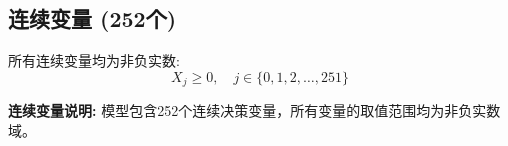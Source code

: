 \documentclass[a4paper,10pt]{article}
\begin{document}
\subsection{连续变量 (252个)}

所有连续变量均为非负实数:
\begin{equation}
X_j \geq 0, \quad j \in \{0, 1, 2, \ldots, 251\}
\end{equation}

\textbf{连续变量说明:} 模型包含252个连续决策变量，所有变量的取值范围均为非负实数域。
\end{document}
